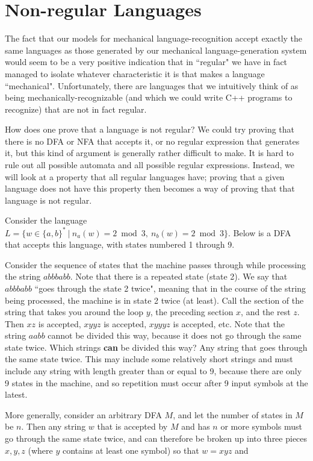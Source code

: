 \section{Non-regular Languages}

The fact that our models for mechanical language-recognition accept exactly the
same languages as those generated by our mechanical language-generation system
would seem to be a very positive indication that in ``regular" 
we have in fact managed to
isolate whatever characteristic it is that makes a language ``mechanical". 
Unfortunately, there are languages that we intuitively think of as being
mechanically-recognizable (and which we could write C++ programs to recognize)
that are not in fact regular.

How does one prove that a language is not regular?  We could try proving that
there is no DFA or NFA that accepts it, or no regular expression that generates
it, but this kind of argument is generally rather difficult to make.  It is hard
to rule out all possible automata and all possible regular expressions.  Instead,
we will look at a property that all
regular languages have; proving that a given language does not have this
property then becomes a way of proving that that language is not regular.

Consider the language 
$L = \{ w \in \{a,b\}^* \ | \ n_a(w) =2 \bmod{3},  \ n_b(w)
= 2 \bmod{3} \}$.  Below is a DFA that accepts this language, with states numbered
1 through 9.


Consider the sequence of states that the machine passes through while
processing the string $abbbabb$. Note that there is a repeated state (state
2).  We say that $abbbabb$ ``goes through the state 2 twice", meaning
that in the course of the string being processed, the
machine is in state 2 twice (at least). 
Call the section of the string that takes you around the loop $y$, 
the preceding section $x$,
and the rest $z$.  Then $xz$ is accepted, $xyyz$ is accepted, $xyyyz$ is
accepted, etc. Note that the string $aabb$ cannot
be divided this way, because it does not go through the same state twice. 
Which
strings {\bf can} be divided this way?  
Any string that goes through the same state
twice.  This may include some relatively short strings and must include any
string with length greater than or equal to 9, because there are only 9 states in
the machine, and so repetition must occur after 9 input symbols at the latest.

More generally, consider an arbitrary DFA $M$, and
let the number of states in $M$ be $n$.  Then any string $w$ that is accepted
by $M$ and has $n$ or more symbols must go through the same state twice, and
can therefore be broken up into three pieces $x,y,z$ (where $y$ contains at
least one symbol) so that $w=xyz$ and

